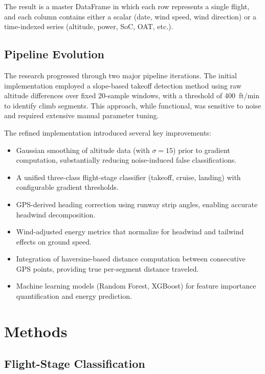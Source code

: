 \documentclass[11pt,a4paper]{article}
\begin{document}
The result is a master DataFrame in which each row represents a single flight, and each column contains either a scalar (date, wind speed, wind direction) or a time-indexed series (altitude, power, SoC, OAT, etc.).

\subsection{Pipeline Evolution}

The research progressed through two major pipeline iterations.
The initial implementation employed a slope-based takeoff detection method using raw altitude differences over fixed 20-sample windows, with a threshold of 400~ft/min to identify climb segments.
This approach, while functional, was sensitive to noise and required extensive manual parameter tuning.

The refined implementation introduced several key improvements:

\begin{itemize}
    \item Gaussian smoothing of altitude data (with $\sigma = 15$) prior to gradient computation, substantially reducing noise-induced false classifications.
    \item A unified three-class flight-stage classifier (takeoff, cruise, landing) with configurable gradient thresholds.
    \item GPS-derived heading correction using runway strip angles, enabling accurate headwind decomposition.
    \item Wind-adjusted energy metrics that normalize for headwind and tailwind effects on ground speed.
    \item Integration of haversine-based distance computation between consecutive GPS points, providing true per-segment distance traveled.
    \item Machine learning models (Random Forest, XGBoost) for feature importance quantification and energy prediction.
\end{itemize}

\section{Methods}

\subsection{Flight-Stage Classification}\label{sec:classification}
\end{document}
